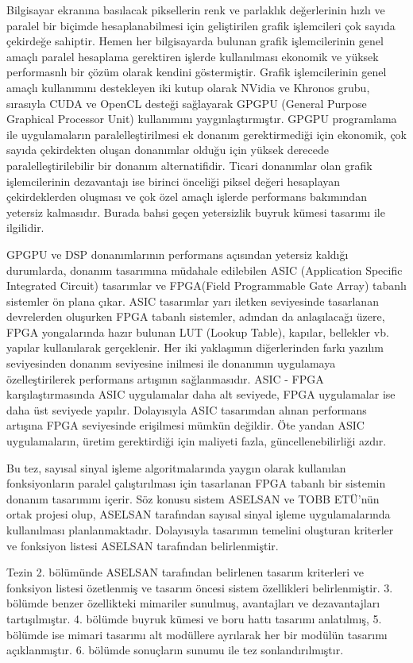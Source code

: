 Bilgisayar ekranına basılacak piksellerin renk ve parlaklık değerlerinin hızlı ve paralel bir biçimde hesaplanabilmesi için geliştirilen grafik işlemcileri çok sayıda çekirdeğe sahiptir.\cite{Kilgariff2005} Hemen her bilgisayarda bulunan grafik işlemcilerinin genel amaçlı paralel hesaplama gerektiren işlerde kullanılması ekonomik ve yüksek performasnlı bir çözüm olarak kendini göstermiştir. Grafik işlemcilerinin genel amaçlı kullanımını destekleyen iki kutup olarak NVidia ve Khronos grubu, sırasıyla CUDA ve OpenCL desteği sağlayarak GPGPU (General Purpose Graphical Processor Unit) kullanımını yaygınlaştırmıştır. \cite{kirk2007nvidia} \cite{stone2010opencl} GPGPU programlama ile uygulamaların paralelleştirilmesi ek donanım gerektirmediği için ekonomik, çok sayıda çekirdekten oluşan donanımlar olduğu için yüksek derecede paralelleştirilebilir bir donanım alternatifidir. Ticari donanımlar olan grafik işlemcilerinin dezavantajı ise birinci önceliği piksel değeri hesaplayan çekirdeklerden oluşması ve çok özel amaçlı işlerde performans bakımından yetersiz kalmasıdır. Burada bahsi geçen yetersizlik buyruk kümesi tasarımı ile ilgilidir.\par

GPGPU ve DSP donanımlarının performans açısından yetersiz kaldığı durumlarda, donanım tasarımına müdahale edilebilen ASIC (Application Specific Integrated Circuit) tasarımlar ve FPGA(Field Programmable Gate Array) tabanlı sistemler ön plana çıkar. ASIC tasarımlar yarı iletken seviyesinde tasarlanan devrelerden oluşurken FPGA tabanlı sistemler, adından da anlaşılacağı üzere, FPGA yongalarında hazır bulunan LUT (Lookup Table), kapılar, bellekler vb. yapılar kullanılarak gerçeklenir. Her iki yaklaşımın diğerlerinden farkı yazılım seviyesinden donanım seviyesine inilmesi ile donanımın uygulamaya özelleştirilerek performans artışının sağlanmasıdır. ASIC - FPGA karşılaştırmasında ASIC uygulamalar daha alt seviyede, FPGA uygulamalar ise daha üst seviyede yapılır. Dolayısıyla ASIC tasarımdan alınan performans artışına FPGA seviyesinde erişilmesi mümkün değildir. Öte yandan ASIC uygulamaların, üretim gerektirdiği için maliyeti fazla, güncellenebilirliği azdır. \cite{kuon2007measuring} \par

Bu tez, sayısal sinyal işleme algoritmalarında yaygın olarak kullanılan fonksiyonların paralel çalıştırılması için tasarlanan FPGA tabanlı bir sistemin donanım tasarımını içerir. Söz konusu sistem ASELSAN ve TOBB ETÜ'nün ortak projesi olup, ASELSAN tarafından sayısal sinyal işleme uygulamalarında kullanılması planlanmaktadır. Dolayısıyla tasarımın temelini oluşturan kriterler ve fonksiyon listesi ASELSAN tarafından belirlenmiştir. \par

Tezin 2. bölümünde ASELSAN tarafından belirlenen tasarım kriterleri ve fonksiyon listesi özetlenmiş ve tasarım öncesi sistem özellikleri belirlenmiştir. 3. bölümde benzer özellikteki mimariler sunulmuş, avantajları ve dezavantajları tartışılmıştır. 4. bölümde buyruk kümesi ve boru hattı tasarımı anlatılmış, 5. bölümde ise mimari tasarımı alt modüllere ayrılarak her bir modülün tasarımı açıklanmıştır. 6. bölümde sonuçların sunumu ile tez sonlandırılmıştır.  
